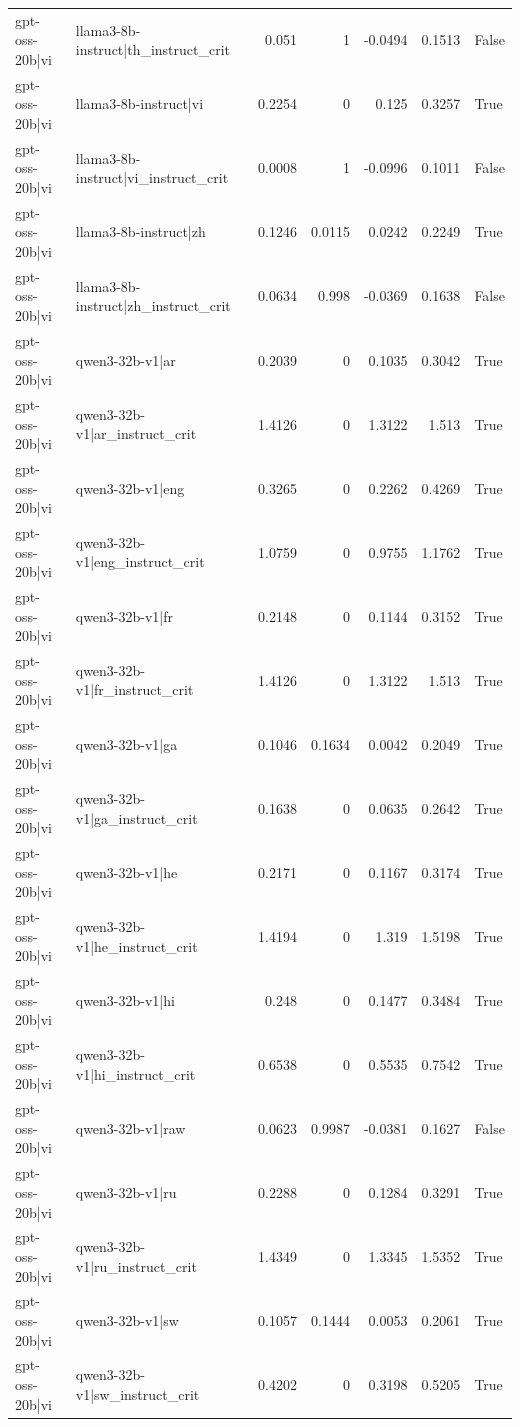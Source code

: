 \begin{table}
\begin{tabular}{l l r r r r l}
gpt-oss-20b|vi & llama3-8b-instruct|th_instruct_crit & 0.051 & 1 & -0.0494 & 0.1513 & False \\
gpt-oss-20b|vi & llama3-8b-instruct|vi & 0.2254 & 0 & 0.125 & 0.3257 & True \\
gpt-oss-20b|vi & llama3-8b-instruct|vi_instruct_crit & 0.0008 & 1 & -0.0996 & 0.1011 & False \\
gpt-oss-20b|vi & llama3-8b-instruct|zh & 0.1246 & 0.0115 & 0.0242 & 0.2249 & True \\
gpt-oss-20b|vi & llama3-8b-instruct|zh_instruct_crit & 0.0634 & 0.998 & -0.0369 & 0.1638 & False \\
gpt-oss-20b|vi & qwen3-32b-v1|ar & 0.2039 & 0 & 0.1035 & 0.3042 & True \\
gpt-oss-20b|vi & qwen3-32b-v1|ar_instruct_crit & 1.4126 & 0 & 1.3122 & 1.513 & True \\
gpt-oss-20b|vi & qwen3-32b-v1|eng & 0.3265 & 0 & 0.2262 & 0.4269 & True \\
gpt-oss-20b|vi & qwen3-32b-v1|eng_instruct_crit & 1.0759 & 0 & 0.9755 & 1.1762 & True \\
gpt-oss-20b|vi & qwen3-32b-v1|fr & 0.2148 & 0 & 0.1144 & 0.3152 & True \\
gpt-oss-20b|vi & qwen3-32b-v1|fr_instruct_crit & 1.4126 & 0 & 1.3122 & 1.513 & True \\
gpt-oss-20b|vi & qwen3-32b-v1|ga & 0.1046 & 0.1634 & 0.0042 & 0.2049 & True \\
gpt-oss-20b|vi & qwen3-32b-v1|ga_instruct_crit & 0.1638 & 0 & 0.0635 & 0.2642 & True \\
gpt-oss-20b|vi & qwen3-32b-v1|he & 0.2171 & 0 & 0.1167 & 0.3174 & True \\
gpt-oss-20b|vi & qwen3-32b-v1|he_instruct_crit & 1.4194 & 0 & 1.319 & 1.5198 & True \\
gpt-oss-20b|vi & qwen3-32b-v1|hi & 0.248 & 0 & 0.1477 & 0.3484 & True \\
gpt-oss-20b|vi & qwen3-32b-v1|hi_instruct_crit & 0.6538 & 0 & 0.5535 & 0.7542 & True \\
gpt-oss-20b|vi & qwen3-32b-v1|raw & 0.0623 & 0.9987 & -0.0381 & 0.1627 & False \\
gpt-oss-20b|vi & qwen3-32b-v1|ru & 0.2288 & 0 & 0.1284 & 0.3291 & True \\
gpt-oss-20b|vi & qwen3-32b-v1|ru_instruct_crit & 1.4349 & 0 & 1.3345 & 1.5352 & True \\
gpt-oss-20b|vi & qwen3-32b-v1|sw & 0.1057 & 0.1444 & 0.0053 & 0.2061 & True \\
gpt-oss-20b|vi & qwen3-32b-v1|sw_instruct_crit & 0.4202 & 0 & 0.3198 & 0.5205 & True \\

\end{tabular}
\end{table}
